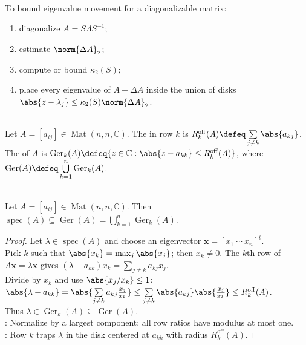 \begin{method} \label{meth:bauer-fike-perturbation-method} \\
To bound eigenvalue movement for a diagonalizable matrix:
\begin{enumerate}[label=(\roman*)]
\setlength{\itemsep}{0pt}
\item diagonalize $A=S\Lambda S^{-1}$;
\item estimate $\norm{\Delta A}_2$;
\item compute or bound $\kappa_2(S)$;
\item place every eigenvalue of $A+\Delta A$ inside the union of disks $\abs{z-\lambda_j}\leq\kappa_2(S)\norm{\Delta A}_2$.
\end{enumerate}
\end{method}

\begin{definition} \label{def:gersgorin-disks} \\
Let $A=[a_{ij}]\in\operatorname{Mat}(n,n,\mathbb{C})$. The  in row $k$ is $R_k^{\mathrm{off}}(A)\defeq\sum\limits_{j\neq k}\abs{a_{kj}}$.\\
The  of $A$ is $\operatorname{Ger}_k(A)\defeq\{z\in\mathbb{C}:\abs{z-a_{kk}}\leq R_k^{\mathrm{off}}(A)\}$, where $\operatorname{Ger}(A)\defeq\bigcup\limits_{k=1}^{n}\operatorname{Ger}_k(A)$.
\end{definition}

\begin{theorem} \label{thm:gersgorin-disk-theorem} \\
Let $A=[a_{ij}]\in\operatorname{Mat}(n,n,\mathbb{C})$. Then $\operatorname{spec}(A)\subseteq \operatorname{Ger}(A)=\bigcup\limits_{k=1}^{n}\operatorname{Ger}_k(A)$.
\begin{proof}
Let $\lambda\in\operatorname{spec}(A)$ and choose an eigenvector $\mathbf{x}=[x_1\ \cdots\ x_n]^t$.\\
Pick $k$ such that $\abs{x_k}=\max_j\abs{x_j}$; then $x_k\neq0$. The $k$th row of $A\mathbf{x}=\lambda\mathbf{x}$ gives $(\lambda-a_{kk})x_k=\sum\limits_{j\neq k}a_{kj}x_j$.\\
Divide by $x_k$ and use $\abs{x_j/x_k}\leq1$: $\abs{\lambda-a_{kk}} =\abs{\sum\limits_{j\neq k}a_{kj}\frac{x_j}{x_k}} \leq\sum\limits_{j\neq k}\abs{a_{kj}}\abs{\frac{x_j}{x_k}} \leq R_k^{\mathrm{off}}(A)$.\\
Thus $\lambda\in \operatorname{Ger}_k(A)\subseteq \operatorname{Ger}(A)$.\\
: Normalize by a largest component; all row ratios have modulus at most one.\\
: Row $k$ traps $\lambda$ in the disk centered at $a_{kk}$ with radius $R_k^{\mathrm{off}}(A)$.
\end{proof}
\end{theorem}

